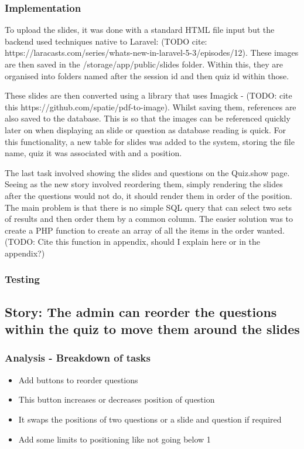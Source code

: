 \subsubsection{Implementation}
To upload the slides, it was done with a standard HTML file input but the backend used techniques native to Laravel: (TODO cite: https://laracasts.com/series/whats-new-in-laravel-5-3/episodes/12). These images are then saved in the /storage/app/public/slides folder. Within this, they are organised into folders named after the session id and then quiz id within those.

These slides are then converted using a library that uses Imagick - (TODO: cite this https://github.com/spatie/pdf-to-image). Whilst saving them, references are also saved to the database. This is so that the images can be referenced quickly later on when displaying an slide or question as database reading is quick. For this functionality, a new table for slides was added to the system, storing the file name, quiz it was associated with and a position. 

The last task involved showing the slides and questions on the Quiz.show page. Seeing as the new story involved reordering them, simply rendering the slides after the questions would not do, it should render them in order of the position. The main problem is that there is no simple SQL query that can select two sets of results and then order them by a common column. The easier solution was to create a PHP function to create an array of all the items in the order wanted. (TODO: Cite this function in appendix, should I explain here or in the appendix?)
\subsubsection{Testing}
\newpage

\subsection{Story: The admin can reorder the questions within the quiz to move them around the slides}
\subsubsection{Analysis - Breakdown of tasks}
\begin{itemize}
	\item Add buttons to reorder questions
	\item This button increases or decreases position of question
	\item It swaps the positions of two questions or a slide and question if required
	\item Add some limits to positioning like not going below 1
\end{itemize}
